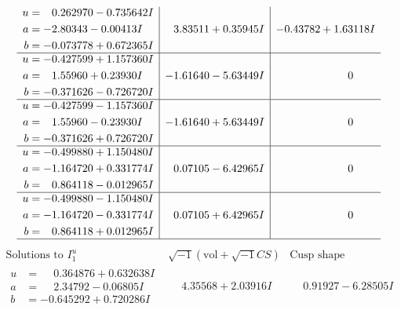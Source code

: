\documentclass[1p]{elsarticle_modified}
\theoremstyle{definition}
\newcommand{\I}{\sqrt{-1}}
\begin{document}
$$\begin{array}{c|c|c}
\begin{aligned}
u &= \phantom{-}0.262970 - 0.735642 I \\
a &= -2.80343 - 0.00413 I \\
b &= -0.073778 + 0.672365 I\end{aligned}
 & \phantom{-}3.83511 + 0.35945 I & -0.43782 + 1.63118 I \\ \hline\begin{aligned}
u &= -0.427599 + 1.157360 I \\
a &= \phantom{-}1.55960 + 0.23930 I \\
b &= -0.371626 - 0.726720 I\end{aligned}
 & -1.61640 - 5.63449 I & \phantom{-0.000000 } 0 \\ \hline\begin{aligned}
u &= -0.427599 - 1.157360 I \\
a &= \phantom{-}1.55960 - 0.23930 I \\
b &= -0.371626 + 0.726720 I\end{aligned}
 & -1.61640 + 5.63449 I & \phantom{-0.000000 } 0 \\ \hline\begin{aligned}
u &= -0.499880 + 1.150480 I \\
a &= -1.164720 + 0.331774 I \\
b &= \phantom{-}0.864118 - 0.012965 I\end{aligned}
 & \phantom{-}0.07105 - 6.42965 I & \phantom{-0.000000 } 0 \\ \hline\begin{aligned}
u &= -0.499880 - 1.150480 I \\
a &= -1.164720 - 0.331774 I \\
b &= \phantom{-}0.864118 + 0.012965 I\end{aligned}
 & \phantom{-}0.07105 + 6.42965 I & \phantom{-0.000000 } 0\\
 \hline 
 \end{array}$$\newpage$$\begin{array}{c|c|c}  
\text{Solutions to }I^u_{1}& \I (\text{vol} + \sqrt{-1}CS) & \text{Cusp shape}\\
 \hline 
\begin{aligned}
u &= \phantom{-}0.364876 + 0.632638 I \\
a &= \phantom{-}2.34792 - 0.06805 I \\
b &= -0.645292 + 0.720286 I\end{aligned}
 & \phantom{-}4.35568 + 2.03916 I & \phantom{-}0.91927 - 6.28505 I \\ \hline\begin{aligned}

\end{aligned}
\end{array}$$
\end{document}
